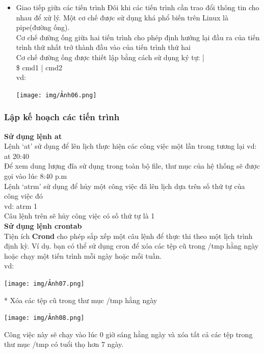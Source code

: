 \documentclass[12pt,a4paper]{article}
\begin{document}
\begin{itemize}
	Lệnh “jobs” để hiển thị trạng thái của các tiến trình đang chạy ở chế độ hậu cảnh.\\
	vd: \\ 
	\begin{verbatim}
		[1] Stopped man ln
		[2] -Stopped tail
		[3] +Stopped ls-R/
	\end{verbatim}
	Dấu ‘-’ và ‘+’ để chỉ ra tiến trình đang chạy ở foreground\\
	\textbf{\textit{Đánh thức tiến trình}}
	Để đánh thức một tiến trình nào đó ở hậu cảnh, người dùng sử dụng lệnh “bg”\\
	vd:  bg\%<job-number>\\
	
	Để chuyển một tiến trình từ hậu cảnh sang chạy trên tiền cảnh, người dùng sử dụng lệnh ‘fg’\\
	vd:  fg 3 
	\item Giao tiếp giữa các tiến trình
	Đôi khi các tiến trình cần trao đổi thông tin cho nhau để xử lý. Một cơ chế được sử dụng khá phổ biến trên Linux là pipe(đường ống).\\
	Cơ chế đường ống giữa hai tiến trình cho phép định hướng lại đầu ra của tiến trình thứ nhất trở thành đầu vào của tiến trình thứ hai\\
	Cơ chế đường ống được thiết lập bằng cách sử dụng ký tự: |\\
	\$ cmd1 | cmd2\\
	vd: 
	\begin{center}
		\texttt{[image: img/Ảnh06.png]}
	\end{center}
\end{itemize}
\subsubsection{Lập kế hoạch các tiến trình}
\textbf{Sử dụng lệnh at}\\
Lệnh ‘at’ sử dụng để lên lịch thực hiện các công việc một lần trong tương lại
vd:  at 20:40\\
Để xem dung lượng đĩa sử dụng trong toàn bộ file, thư mục của hệ thống sẽ được gọi vào lúc 8:40 p.m\\

Lệnh ‘atrm’ sử dụng để hủy một công việc đã lên lịch dựa trên số thứ tự của công việc đó\\
vd:  atrm 1 \\
Câu lệnh trên sẽ hủy công việc có số thứ tự là 1\\
\textbf{Sử dụng lệnh crontab}\\
Tiện ích \textbf{Crond} cho phép sắp xếp một câu lệnh để thực thi theo một lịch trình định kỳ. Ví dụ. bạn có thể sử dụng cron để xóa các tệp cũ trong /tmp hằng ngày hoặc chạy một tiến trình mỗi ngày hoặc mỗi tuần.\\
vd:
\begin{center}
	\texttt{[image: img/Ảnh07.png]}
\end{center}
* Xóa các tệp cũ trong thư mục /tmp hằng ngày
\begin{center}
	\texttt{[image: img/Ảnh08.png]}
\end{center}
Công việc này sẽ chạy vào lúc 0 giờ sáng hằng ngày và xóa tất cả các tệp trong thư mục /tmp có tuổi thọ hơn 7 ngày.
\end{document}
